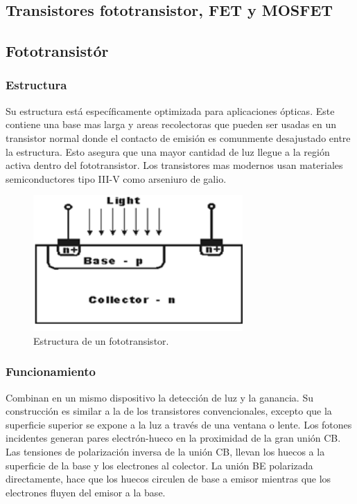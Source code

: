\documentclass[letterpaper, 12pt]{article}
\begin{document}
\begin{justify}
        \section{Transistores fototransistor, FET y MOSFET}
        \subsection{Fototransistór}
        \subsubsection{Estructura}
        Su estructura está específicamente optimizada para aplicaciones ópticas. Este contiene una base mas larga y areas recolectoras que pueden ser usadas en un transistor normal donde el contacto de emisión es comunmente desajustado entre la estructura. Esto asegura que una
        mayor cantidad de luz llegue a la región activa dentro del fototransistor. Los transistores mas modernos usan materiales semiconductores tipo III-V como arseniuro de galio.
        \begin{figure}[H]
            \centering
            \includegraphics[width=8cm]{photo.png}
            \caption{Estructura de un fototransistor.}
            \label{fig:StructTransFoto}
        \end{figure}
        \subsubsection{Funcionamiento}
        Combinan en un mismo dispositivo la detección de luz y la ganancia. Su construcción es similar a la de los transistores convencionales, excepto que la superficie superior se expone a la luz 
        a través de una ventana o lente. Los fotones incidentes generan pares electrón-hueco en la proximidad de la gran unión CB. Las tensiones de polarización inversa de la unión CB, llevan los huecos
        a la superficie de la base y los electrones al colector. La unión BE polarizada directamente, hace que los huecos circulen de base a emisor mientras que los electrones fluyen del emisor a la base.

\end{justify}
\end{document}
